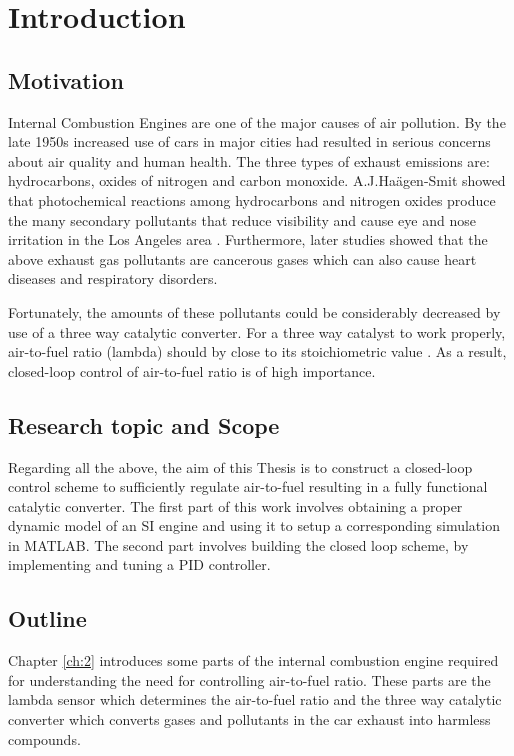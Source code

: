 \chapter{Introduction}

\section{Motivation}
Internal Combustion Engines are one of the major causes of air pollution. By the late 1950s increased use of cars in major cities \cite{haagen1955automobile} \cite{haagen1953ozone} had resulted in serious concerns about air quality and human health. The three types of exhaust emissions are: hydrocarbons, oxides of nitrogen and carbon monoxide. A.J.Haägen-Smit showed that photochemical reactions among hydrocarbons and nitrogen oxides produce the many secondary pollutants that reduce visibility and cause eye and nose irritation in the Los Angeles area \cite{la}. Furthermore, later studies showed that the above exhaust gas pollutants are cancerous gases which can also cause heart diseases and respiratory disorders.

Fortunately, the amounts of these pollutants could be considerably decreased by use of a three way catalytic converter. For a three way catalyst to work properly, air-to-fuel ratio (lambda) should by close to its stoichiometric value \cite{Nielsen_2000}. As a result, closed-loop control of air-to-fuel ratio is of high importance.

\section{Research topic and Scope}

Regarding all the above, the aim of this Thesis is to construct a closed-loop control scheme to sufficiently regulate air-to-fuel resulting in a fully functional catalytic converter. The first part of this work involves obtaining a proper dynamic model of an SI engine and using it to setup a corresponding simulation in MATLAB. The second part involves building the closed loop scheme, by implementing and tuning a PID controller. 

\section{Outline}

Chapter \ref{ch:2} introduces some parts of the internal combustion engine required for understanding the need for controlling air-to-fuel ratio. These parts are the lambda sensor which determines the air-to-fuel ratio and the three way catalytic converter which converts gases and pollutants in the car exhaust into harmless compounds.

